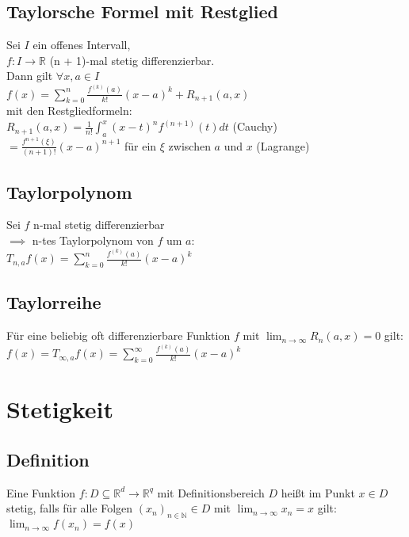 \documentclass[a4paper,9pt]{extarticle}
\newcommand{\liminfty}[1][n]{\lim_{#1 \to \infty}}
\newcommand{\suminfty}[1][k = 1]{\sum_{#1}^{\infty}}
\begin{document}
	\subsection*{Taylorsche Formel mit Restglied}
	Sei $I$ ein offenes Intervall,\\
	$f : I → \mathbb{R}$ (n + 1)-mal stetig differenzierbar. \\
	Dann gilt $\forall x,a \in I$ \\
	$f(x) = \sum_{k = 0}^n \frac{f^{(k)}(a)}{k!} (x - a)^k + R_{n+1} (a,x)$ \\
	mit den Restgliedformeln: \\
	$R_{n+1}(a,x) = \frac 1 {n!} \int_a^x (x - t)^n f^{(n+1)} (t) dt$ (Cauchy) \\
	$= \frac{f^{n+1}(\xi)}{(n + 1)!} (x - a)^{n + 1}$ für ein $\xi$ zwischen $a$ und $x$ (Lagrange)
	
	\subsection*{Taylorpolynom}
	Sei $f$ n-mal stetig differenzierbar \\
	$\implies$ n-tes Taylorpolynom von $f$ um $a$: \\
	$T_{n,a} f(x) = \sum_{k = 0}^{n} \frac{f^{(k)}(a)}{k!} (x - a)^k$
	
	\subsection*{Taylorreihe}
	Für eine beliebig oft differenzierbare Funktion $f$ mit $\liminfty R_n(a,x) = 0$ gilt: \\
	$f(x) = T_{∞,a} f(x) = \suminfty[k = 0] \frac{f^{(k)}(a)}{k!} (x - a)^k$
	
	\newpage

\section*{Stetigkeit}


	\subsection*{Definition}

	Eine Funktion $f: D \subseteq \mathbb{R}^d \to \mathbb{R}^q$ mit Definitionsbereich $D$ heißt im Punkt $x \in D$ stetig,
	falls für alle Folgen $(x_n)_{n \in \mathbb{N}} \in D$ mit $\liminfty{x_n} = x$ gilt: \\
	$\liminfty{f(x_n)} = f(x)$ \\
\end{document}
